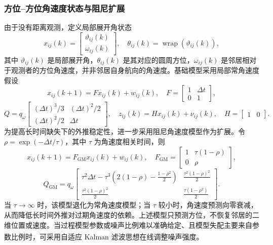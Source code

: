 \documentclass[UTF8,fontset=windows,11pt]{ctexart}
\newcommand{\upcite}[1]{\textsuperscript{\cite{#1}}}
\begin{document}
\subsubsection{方位--方位角速度状态与阻尼扩展}
由于没有距离观测，定义局部展开角状态
\begin{equation}
 x_{ij}(k)=\begin{bmatrix}\vartheta_{ij}(k)\\ \omega_{ij}(k)\end{bmatrix},
 \quad \theta_{ij}(k)=\operatorname{wrap}(\vartheta_{ij}(k)),
\end{equation}
其中 $\vartheta_{ij}(k)$ 是局部展开角，$\theta_{ij}(k)$ 是其对应的圆周方位，$\omega_{ij}(k)$ 是邻居相对于观测者的方位角速度，并非邻居自身航向的角速度。基础模型采用局部常角速度假设
\begin{equation}
 x_{ij}(k+1)=F x_{ij}(k)+w_{ij}(k),
 \quad F=\begin{bmatrix}1&\Delta t\\0&1\end{bmatrix},
\end{equation}
\begin{equation}
 Q=q_\omega\begin{bmatrix}(\Delta t)^3/3&(\Delta t)^2/2\\(\Delta t)^2/2&\Delta t\end{bmatrix},
 \quad z_{ij}(k)=Hx_{ij}(k)+\nu_{ij}(k),\quad H=\begin{bmatrix}1&0\end{bmatrix}.
\end{equation}
为提高长时间缺失下的外推稳定性，进一步采用阻尼角速度模型作为扩展。令
$\rho=\exp(-\Delta t/\tau)$，其中 $\tau$ 为角速度相关时间，则
\begin{equation}
 x_{ij}(k+1)=F_{\mathrm{GM}}x_{ij}(k)+w_{ij}(k),
 \quad
 F_{\mathrm{GM}}=\begin{bmatrix}1&\tau(1-\rho)\\0&\rho\end{bmatrix},
\end{equation}
\begin{equation}
 Q_{\mathrm{GM}}=q_\omega
 \begin{bmatrix}
 \tau^2\Delta t-\tau^3\left(2(1-\rho)-\frac{1-\rho^2}{2}\right)
 & \frac{\tau^2(1-\rho)^2}{2}\\[2mm]
 \frac{\tau^2(1-\rho)^2}{2}
 & \frac{\tau(1-\rho^2)}{2}
 \end{bmatrix}.
\end{equation}
当 $\tau\to\infty$ 时，该模型退化为常角速度模型；当 $\tau$ 较小时，角速度预测向零衰减，从而降低长时间外推对过期角速度的依赖。上述模型只预测方位，不恢复邻居的二维位置或速度。当过程模型参数或噪声比例难以准确给定、且模型失配主要来自参数比例时，可采用自适应 Kalman 滤波思想在线调整噪声强度\upcite{Ge2025}。
\end{document}
